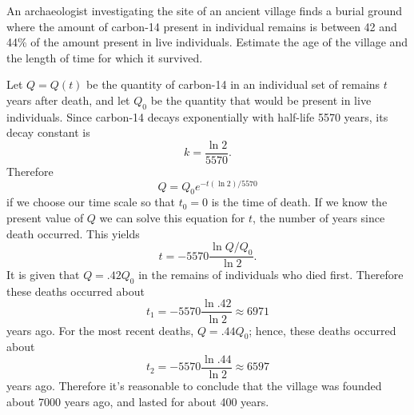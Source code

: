 \setcounter{example}{4}
\begin{example}
  \label{example:4.1.5} \rm An archaeologist investigating the site of an ancient village finds a
  burial ground where the amount of carbon-14 present in individual remains is between 42 and 44\%
  of the amount present in live individuals. Estimate the age of the village and the length of time
  for which it survived.
\end{example}
\begin{examplesolution}
\solution Let $Q=Q(t)$ be the quantity of carbon-14 in an individual set of remains $t$ years after
death, and let $Q_{0}$ be the quantity that would be present in live individuals. Since carbon-14
decays exponentially with half-life 5570 years, its decay constant is
\[
  k=\frac{\ln2}{5570}.
\]
Therefore
\[
  Q=Q_{0}e^{-t(\ln2)/5570}
\]
if we choose our time scale so that $t_{0}=0$ is the time of death. If we know the present value of
$Q$ we can solve this equation for $t$, the number of years since death occurred. This yields
\[
  t=-5570{\frac{\ln Q/Q_{0}}{\ln2}}.
\]
It is given that $Q=.42Q_{0}$ in the remains of individuals who died first. Therefore these deaths
occurred about
\[
  t_{1}=-5570{\frac{\ln.42}{\ln2}}\approx6971
\]
years ago. For the most recent deaths, $Q=.44 Q_{0}$; hence, these deaths occurred about
\[
  t_{2}=-5570{\frac{\ln.44}{\ln2}}\approx6597
\]
years ago. Therefore it's reasonable to conclude that the village was founded about 7000 years ago,
and lasted for about 400 years.
\end{examplesolution}

